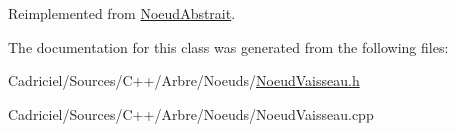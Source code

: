 Reimplemented from \hyperlink{group__inf2990_gadc6ebe69894dbb682fdd0ecb1b6c11e9}{Noeud\-Abstrait}.



The documentation for this class was generated from the following files\-:\begin{DoxyCompactItemize}
\item 
Cadriciel/\-Sources/\-C++/\-Arbre/\-Noeuds/\hyperlink{_noeud_vaisseau_8h}{Noeud\-Vaisseau.\-h}\item 
Cadriciel/\-Sources/\-C++/\-Arbre/\-Noeuds/Noeud\-Vaisseau.\-cpp\end{DoxyCompactItemize}
